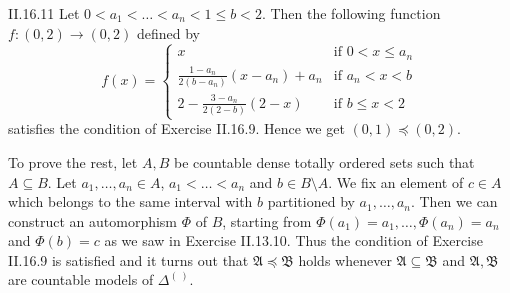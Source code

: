 \documentclass[12pt]{article}
\begin{document}
\begin{customthm}{II.16.11}
  Let $0<a_1<\ldots<a_n<1\leq b<2$. Then the following function $f:(0,2)\rightarrow(0,2)$ defined by
  \[
    f(x)=
    \begin{cases}
      x & \text{if } 0<x\leq a_n \\
      \frac{1-a_n}{2(b-a_n)}(x-a_n)+a_n & \text{if } a_n<x<b \\
      2-\frac{3-a_n}{2(2-b)}(2-x) & \text{if } b\leq x<2
    \end{cases}
  \]
  satisfies the condition of Exercise II.16.9. Hence we get $(0,1)\preccurlyeq(0,2)$.

  To prove the rest, let $A,B$ be countable dense totally ordered sets such that $A\subseteq B$. Let $a_1,\ldots,a_n\in A$, $a_1<\ldots<a_n$ and $b\in B\setminus A$. We fix an element of $c\in A$ which belongs to the same interval with $b$ partitioned by $a_1,\ldots,a_n$. Then we can construct an automorphism $\Phi$ of $B$, starting from $\Phi(a_1)=a_1,\ldots,\Phi(a_n)=a_n$ and $\Phi(b)=c$ as we saw in Exercise II.13.10. Thus the condition of Exercise II.16.9 is satisfied and it turns out that $\mathfrak{A}\preccurlyeq\mathfrak{B}$ holds whenever $\mathfrak{A}\subseteq\mathfrak{B}$ and $\mathfrak{A},\mathfrak{B}$ are countable models of $\Delta^{(~)}$.
\end{customthm}
\end{document}
